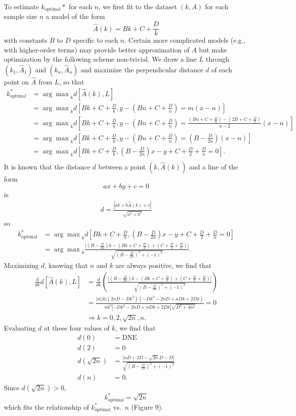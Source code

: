 \documentclass[
  12pt,
]{article}
\begin{document}
To estimate \(k_\mathrm{optimal}*\) for each \(n\), we first fit to the
dataset \((k,A)\) for each sample size \(n\) a model of the form
\[\hat{A}(k) = Bk + C + \frac{D}{k}\] with constants \(B\) to \(D\)
specific to each \(n\). Certain more complicated models (e.g., with
higher-order terms) may provide better approximation of \(A\) but make
optimization by the following scheme non-trivial. We draw a line \(L\)
through \((k_1, \hat{A}_1)\) and \((k_n, \hat{A}_n)\) and maximize the
perpendicular distance \(d\) of each point on \(\hat{A}\) from \(L\), so
that \begin{align*}
k^*_{\mathrm{optimal}} &= {\arg\max}_k{d[\hat{A}(k),L]} \\
                       &= {\arg\max}_k{d[Bk+C+\frac{D}{k},y-(Bn+C+\frac{D}{n})=m(x-n)]} \\
                       &= {\arg\max}_k{d[Bk+C+\frac{D}{k},y-(Bn+C+\frac{D}{n})=\frac{(Bn+C+\frac{D}{n})-(2B+C+\frac{D}{2})}{n-2}(x-n)]} \\
                       &= {\arg\max}_k{d[Bk+C+\frac{D}{k},y-(Bn+C+\frac{D}{n})=(B-\frac{D}{2n})(x-n)]} \\
                       &= {\arg\max}_k{d[Bk+C+\frac{D}{k},(B-\frac{D}{2n})x-y+C+\frac{D}{2}+\frac{D}{n}=0]}. \\
\end{align*} It is known that the distance \(d\) between a point
\((k, \hat{A}(k))\) and a line of the form \[ax + by + c = 0\] is
\begin{align*}
d = \frac{|ak + b\hat{A}(k) + c|}{\sqrt{a^2+b^2}}
\end{align*} so \begin{align*}
k^*_{\mathrm{optimal}} &= {\arg\max}_k{d[Bk+C+\frac{D}{k},(B-\frac{D}{2n})x-y+C+\frac{D}{2}+\frac{D}{n}=0]} \\
                       &= {\arg\max}_k{\frac{|(B-\frac{D}{2n})k-(Bk+C+\frac{D}{k})+(C+\frac{D}{2}+\frac{D}{n})|}{\sqrt{(B-\frac{D}{2n})^2+(-1)^2}}}.
\end{align*} Maximizing \(d\), knowing that \(n\) and \(k\) are always
positive, we find that \begin{align*}
\frac{d}{dk}d[\hat{A}(k),L] &= \frac{d}{dk}\left(\frac{|(B-\frac{D}{2n})k-(Bk+C+\frac{D}{k})+(C+\frac{D}{2}+\frac{D}{n})|}{\sqrt{(B-\frac{D}{2n})^2+(-1)^2}}\right) \\
                            &=\frac{|n||k|(2nD-Dk^2)(-Dk^2-2nD+nDk+2Dk)}{nk^3|-Dk^2-2nD+nDk+2Dk|\sqrt{D^2+4n^2}} = 0 \\
                            &\Rightarrow k = 0, 2, \sqrt{2n}, n.
\end{align*} Evaluating \(d\) at these four values of \(k\), we find
that \begin{align*}
d(0) &= \mathrm{DNE} \\
d(2) &= 0 \\
d(\sqrt{2n}) &=  \frac{|nD+2D-\sqrt{2n}D-D|}{\sqrt{(B-\frac{D}{2n})^2+(-1)^2}} \\
d(n) &= 0.
\end{align*} Since \(d(\sqrt{2n}) > 0\),
\[k^*_{\mathrm{optimal}} = \sqrt{2n}\] which fits the relationship of
\(k^*_{\mathrm{optimal}}\) vs.~\(n\) (Figure 9).
\end{document}

